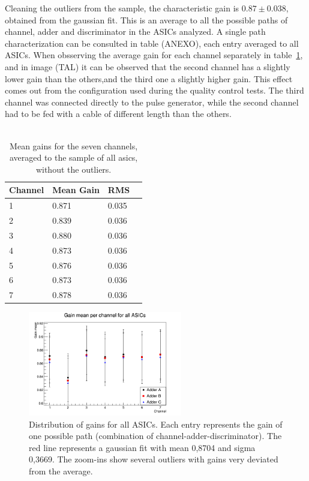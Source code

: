 \documentclass[a4paper,10pt]{book}
\begin{document}
Cleaning the outliers from the sample, the characteristic gain is $0.87 \pm 0.038$, obtained from the gaussian fit. This is an average to all the possible paths of channel, adder and discriminator in the ASICs
analyzed. A single path characterization can be consulted in table (ANEXO), each entry averaged to all ASICs. 
When obsserving the average gain for each channel separately in table~\ref{tab:gainch}, and in image (TAL) it can be observed that the second channel has a slightly lower gain than the others,and the third one a slightly higher gain. 
This effect comes out from the configuration used during the quality control tests. The third channel was connected directly to the pulse generator, while the second channel had to be fed
with a cable of different length than the others. 
\\\\
\begin{table}
\centering
\begin{tabular}{l|l|l|l}
Channel & Mean Gain & RMS \\\hline
1 & 0.871 & 0.035 \\
2 & 0.839 & 0.036 \\
3 & 0.880 & 0.036 \\
4 & 0.873 & 0.036 \\
5 & 0.876 & 0.036 \\
6 & 0.873 & 0.036 \\
7 & 0.878 & 0.036 \\
\end{tabular}
\caption{\label{tab:gainch} Mean gains for the seven channels, averaged to the sample of all asics, without the outliers.}
\end{table}

\begin{figure}
\centering
 \includegraphics[width=0.6\textwidth]{./gainschannel.png}
  \caption{Distribution of gains for all ASICs. Each entry represents the gain of one possible path (combination of channel-adder-discriminator). The red line represents a gaussian fit with mean 0,8704 and sigma 0,3669. 
  The zoom-ins show several outliers with gains very deviated from the average. }
    \label{fig:gainch}
\end{figure}
\end{document}
